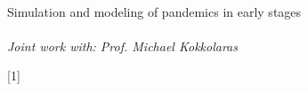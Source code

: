 \addtocounter{footnote}{-1}
\begin{frame}[c,noframenumbering]
	\centering
	\begin{titleblock}{}
		\centering 
		~\\%
		{\centering\LARGE Simulation and modeling of pandemics in early stages\ifshowcitations\footnotemark[1]\fi\\}%
		~\\%
		{\textit{Joint work with: Prof. Michael Kokkolaras}}
	\end{titleblock}
	{\color{white}\ifshowcitations{}\fi}
\end{frame}
\addtocounter{footnote}{-1}
